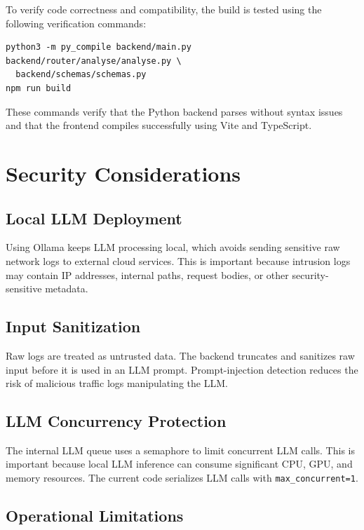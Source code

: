 \documentclass[12pt,a4paper]{report}
\begin{document}
To verify code correctness and compatibility, the build is tested using the following verification commands:
\begin{lstlisting}[style=bashstyle, caption={Verification commands}]
python3 -m py_compile backend/main.py backend/router/analyse/analyse.py \
  backend/schemas/schemas.py
npm run build
\end{lstlisting}

These commands verify that the Python backend parses without syntax issues and that the frontend compiles successfully using Vite and TypeScript.

\chapter{Security Considerations}

\section{Local LLM Deployment}

Using Ollama keeps LLM processing local, which avoids sending sensitive raw
network logs to external cloud services. This is important because intrusion
logs may contain IP addresses, internal paths, request bodies, or other
security-sensitive metadata.

\section{Input Sanitization}

Raw logs are treated as untrusted data. The backend truncates and sanitizes
raw input before it is used in an LLM prompt. Prompt-injection detection
reduces the risk of malicious traffic logs manipulating the LLM.

\section{LLM Concurrency Protection}

The internal LLM queue uses a semaphore to limit concurrent LLM calls. This is
important because local LLM inference can consume significant CPU, GPU, and
memory resources. The current code serializes LLM calls with
\texttt{max\_concurrent=1}.

\section{Operational Limitations}
\end{document}
